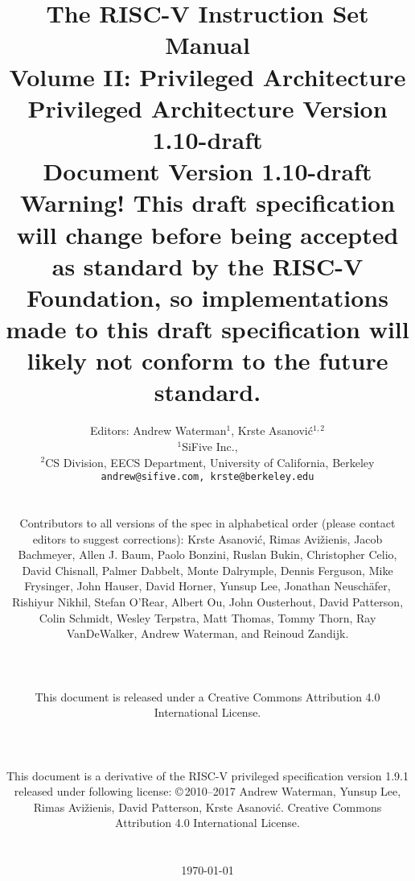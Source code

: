 \documentclass[twoside,11pt]{book}
\newcommand{\privrev}{1.10-draft}
\begin{document}
\title{{\vspace{-0.7in}\Large {\bf The RISC-V Instruction Set Manual}} \\
  \large {\bf Volume II: Privileged Architecture} \\
  Privileged Architecture Version \privrev \\
  Document Version \privrev \\
    {\bf Warning! This draft specification
    will change before being accepted as standard by the RISC-V Foundation, so
    implementations made to this draft specification will likely not conform
    to the future standard.}
  \vspace{-0.1in}}

\author{Editors: Andrew Waterman$^{1}$, Krste Asanovi\'{c}$^{1,2}$ \\
  $^{1}$SiFive Inc., \\
  $^{2}$CS Division, EECS Department, University of California, Berkeley \\
  {\tt andrew@sifive.com, krste@berkeley.edu} \\
  \\
  \parbox{\textwidth}{
  Contributors to all versions of the spec in alphabetical order
  (please contact editors to suggest corrections): Krste Asanovi\'{c},
  Rimas Avi\v{z}ienis, Jacob Bachmeyer, Allen J. Baum, Paolo Bonzini,
  Ruslan Bukin, Christopher Celio, David Chisnall, Palmer Dabbelt,
  Monte Dalrymple, Dennis Ferguson, Mike Frysinger, John Hauser, David
  Horner, Yunsup Lee, Jonathan Neusch{\"a}fer, Rishiyur Nikhil, Stefan
  O'Rear, Albert Ou, John Ousterhout, David Patterson, Colin Schmidt,
  Wesley Terpstra, Matt Thomas, Tommy Thorn, Ray VanDeWalker,
  Andrew Waterman, and Reinoud Zandijk.}
  \\
  \\
  \parbox{\textwidth}{
  This document is released under a Creative Commons Attribution 4.0
  International License.
  }
  \\
  \\
  \parbox{\textwidth}{
    This document is a derivative of the RISC-V
    privileged specification version 1.9.1 released under following license:
    \copyright \,2010--2017 Andrew Waterman, Yunsup Lee, Rimas
    Avi\v{z}ienis, David Patterson, Krste Asanovi\'{c}. 
    Creative Commons Attribution 4.0 International License.
  }
  \\
  \\
  \today
}

\date{} 
\maketitle
\end{document}
